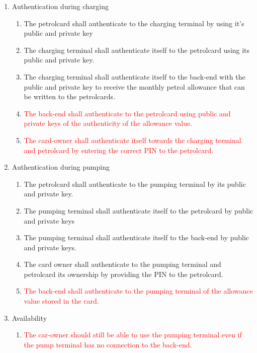 \begin{enumerate}
\item Authentication during charging
		\begin{enumerate}
		\item The petrolcard shall authenticate to the charging terminal by using it's public and private key%
		\item The charging terminal shall authenticate itself to the petrolcard using its public and private key.
		\item The charging terminal shall authenticate itself to the back-end with the public and private key to receive the monthly petrol allowance that can be written to the petrolcards.
		\item \textcolor{red}{The back-end shall authenticate to the petrolcard using public and private keys of the authenticity of the allowance value.}
		\item \textcolor{red}{The card-owner shall authenticate itself towards the charging terminal and petrolcard by entering the correct PIN to the petrolcard.}
		\end{enumerate}	
		
\item Authentication during pumping
	\begin{enumerate}
	\item The petrolcard shall authenticate to the pumping terminal by its public and private key. %
	\item The pumping terminal shall authenticate itself to the petrolcard by public and private keys
	\item The pumping terminal shall authenticate itself to the back-end by public and private keys.
	\item The card owner shall authenticate to the pumping terminal and petrolcard its ownership by providing the PIN to the petrolcard.
	\item \textcolor{red}{The back-end shall authenticate to the pumping terminal of the allowance value stored in the card.}
	\end{enumerate}		


\item Availability
	\begin{enumerate}
	\item \textcolor{red}{The car-owner should still be able to use the pumping terminal even if the pump terminal has no connection to the back-end.}
	\end{enumerate}	



\end{enumerate}
